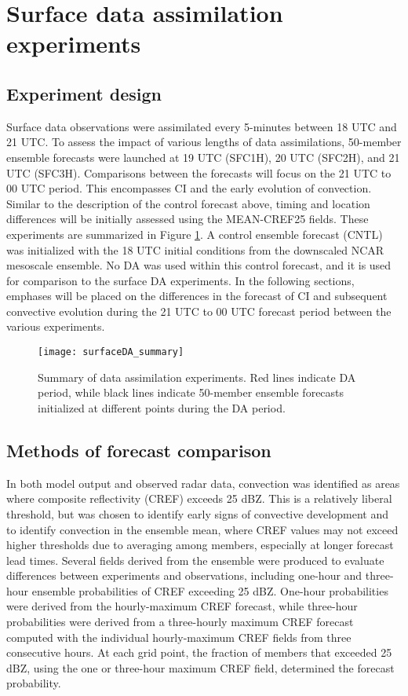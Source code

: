 \section{Surface data assimilation experiments}
\subsection{Experiment design}
Surface data observations were assimilated every 5-minutes between 18 UTC and 21 UTC. To assess the impact of various lengths of data assimilations, 50-member ensemble forecasts were launched at 19 UTC (SFC1H), 20 UTC (SFC2H), and 21 UTC (SFC3H). Comparisons between the forecasts will focus on the 21 UTC to 00 UTC period. This encompasses CI and the early evolution of convection. Similar to the description of the control forecast above, timing and location differences will be initially assessed using the MEAN-CREF25 fields. These experiments are summarized in Figure \ref{sfcsummary}. A control ensemble forecast (CNTL) was initialized with the 18 UTC initial conditions from the downscaled NCAR mesoscale ensemble. No DA was used within this control forecast, and it is used for comparison to the surface DA experiments. In the following sections, emphases will be placed on the differences in the forecast of CI and subsequent convective evolution during the 21 UTC to 00 UTC forecast period between the various experiments.

\begin{figure}
\centering
\texttt{[image: surfaceDA\_summary]}
\caption{Summary of data assimilation experiments. Red lines indicate DA period, while black lines indicate 50-member ensemble forecasts initialized at different points during the DA period.}
\label{sfcsummary}
\end{figure}

\subsection{Methods of forecast comparison}
\label{fcstcompare}
In both model output and observed radar data, convection was identified as areas where composite reflectivity (CREF) exceeds 25 dBZ. This is a relatively liberal threshold, but was chosen to identify early signs of convective development and to identify convection in the ensemble mean, where CREF values may not exceed higher thresholds due to averaging among members, especially at longer forecast lead times. Several fields derived from the ensemble were produced to evaluate differences between experiments and observations, including one-hour and three-hour ensemble probabilities of CREF exceeding 25 dBZ. One-hour probabilities were derived from the hourly-maximum CREF forecast, while three-hour probabilities were derived from a three-hourly maximum CREF forecast computed with the individual hourly-maximum CREF fields from three consecutive hours. At each grid point, the fraction of members that exceeded 25 dBZ, using the one or three-hour maximum CREF field, determined the forecast probability.

